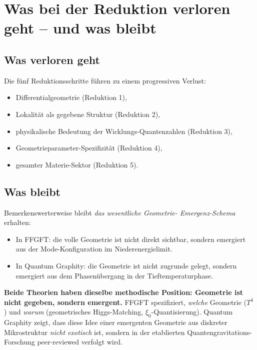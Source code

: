 \section{Was bei der Reduktion verloren geht -- und was bleibt}

\subsection{Was verloren geht}

Die fünf Reduktionsschritte führen zu einem progressiven Verlust:
\begin{itemize}[leftmargin=2em,itemsep=2pt,topsep=2pt]
  \item Differentialgeometrie (Reduktion 1),
  \item Lokalität als gegebene Struktur (Reduktion 2),
  \item physikalische Bedeutung der Wicklungs-Quantenzahlen
        (Reduktion 3),
  \item Geometrieparameter-Spezifizität (Reduktion 4),
  \item gesamter Materie-Sektor (Reduktion 5).
\end{itemize}

\subsection{Was bleibt}

Bemerkenswerterweise bleibt \emph{das wesentliche Geometrie-
Emergenz-Schema} erhalten:
\begin{itemize}[leftmargin=2em,itemsep=2pt,topsep=2pt]
  \item In FFGFT: die volle Geometrie ist nicht direkt sichtbar,
        sondern emergiert aus der Mode-Konfiguration im
        Niederenergielimit.
  \item In Quantum Graphity: die Geometrie ist nicht zugrunde gelegt,
        sondern emergiert aus dem Phasenübergang in der
        Tieftemperaturphase.
\end{itemize}

\textbf{Beide Theorien haben dieselbe methodische Position:
Geometrie ist nicht gegeben, sondern emergent.} FFGFT spezifiziert,
\emph{welche} Geometrie ($T^4$) und \emph{warum} (geometrisches
Higgs-Matching, $\xi_0$-Quantisierung). Quantum Graphity zeigt, dass
diese Idee einer emergenten Geometrie aus diskreter Mikrostruktur
\emph{nicht exotisch} ist, sondern in der etablierten Quantengravitations-
Forschung peer-reviewed verfolgt wird.

